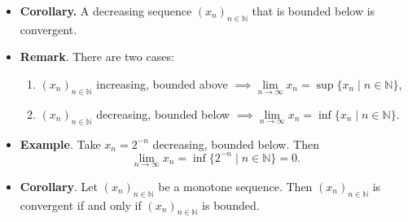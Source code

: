 \documentclass{article}
\newcommand{\N}{\mathbb{N}}
\newcommand{\seq}[2]{(#1_{#2})_{#2 \in \N}}
\newcommand{\set}[2]{\{ #1 \mid #2 \}}
\newcommand{\?}{\stackrel{?}{=}}
\theoremstyle{definition} %
\begin{document}
\begin{itemize}
\begin{proof}
        We want to show that $\seq{x}{n}$ converges to $x = \sup(X)$. This means (by definition) that for every $\varepsilon > 0$, there exists $N(\varepsilon) \in \N$ such that
        $$|x_n - x| \leq \varepsilon \ \forall n \geq N(\varepsilon).$$
        Note that $x = \sup(X)$ implies two important things:
        \begin{enumerate}[label=(\roman*)]
            \item $x_n \leq x \ \forall n \in \N$,
            \item $\forall \varepsilon > 0, \ \exists x_\varepsilon \in X$ such that $x - x_\varepsilon \leq \varepsilon$ by the characterization of supremum. Note, we can equivalently replace $x_\varepsilon$ with $x_{n_\varepsilon} \in \N$ to obtain $\forall \varepsilon > 0, \ \exists x_{n_\varepsilon} \in X$ such that $x - x_{n_\varepsilon} \leq \varepsilon$.
        \end{enumerate}
        So, let $\varepsilon > 0$, compute
        \begin{align*}
            |x_n - x| &= x - x_n \\
            &\leq x - x_{n_\varepsilon} \leq \varepsilon
        \end{align*}
        with $x_{n_\varepsilon} \leq x_n$ and $n \geq n_\varepsilon$ ($\seq{x}{n}$ increasing) and for all $\varepsilon > 0$, take $N(\varepsilon) = n_\varepsilon$.
    \end{proof}
    \item \textbf{Corollary.} A decreasing sequence $\seq{x}{n}$ that is bounded below is convergent.
    \item \textbf{Remark}. There are two cases:
    \begin{enumerate}[label=(\roman*)]
        \item $\seq{x}{n}$ increasing, bounded above $\implies \lim\limits_{n \to \infty} x_n = \sup \set{x_n}{n \in \N}$,
        \item $\seq{x}{n}$ decreasing, bounded below $\implies \lim\limits_{n \to \infty} x_n = \inf \set{x_n}{n \in \N}$.
    \end{enumerate}
    \item \textbf{Example}. Take $x_n = 2^{-n}$ decreasing, bounded below. Then
    $$\lim\limits_{n \to \infty} x_n = \inf\set{2^{-n}}{ n \in \N} = 0.$$
    \item \textbf{Corollary}. Let $\seq{x}{n}$ be a monotone sequence. Then $\seq{x}{n}$ is convergent if and only if $\seq{x}{n}$ is bounded.
\end{itemize}
\end{document}
